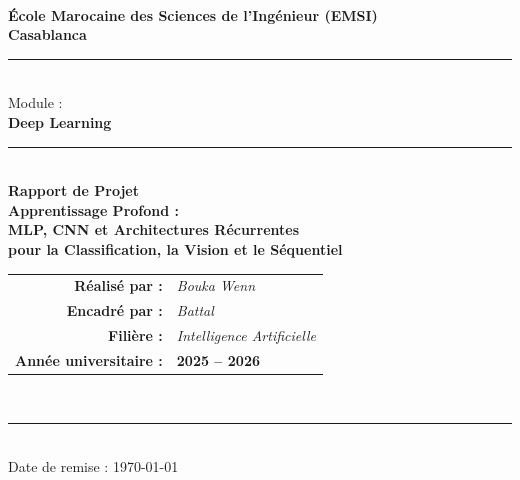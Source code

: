 \documentclass[11pt,a4paper]{article}
\begin{document}
\begin{titlepage}
  \centering


  {\Large\bfseries {}}\\[1.5cm]

  {\Large\bfseries École Marocaine des Sciences de l'Ingénieur (EMSI)\\
  Casablanca}\\[0.3cm]
  \rule{\linewidth}{0.5pt}\\[0.6cm]

  {\large Module :}\\[0.2cm]
  {\LARGE\bfseries Deep Learning}\\[0.8cm]

  \rule{\linewidth}{0.5pt}\\[0.6cm]

  {\huge\bfseries Rapport de Projet\\[0.4cm]
  Apprentissage Profond :}\\[0.4cm]
  {\Large\bfseries MLP, CNN et Architectures Récurrentes\\
  pour la Classification, la Vision et le Séquentiel}\\[1.2cm]

  \begin{tabular}{rl}
    \textbf{Réalisé par :}      & \textit{Bouka Wenn} \\[0.3cm]
    \textbf{Encadré par :}      & \textit{Battal}      \\[0.3cm]
    \textbf{Filière :}          & \textit{Intelligence Artificielle}        \\[0.3cm]
    \textbf{Année universitaire :} & \textbf{2025 -- 2026}
  \end{tabular}\\[2cm]

  \rule{\linewidth}{0.5pt}\\[0.4cm]
  {\large Date de remise : \today}

\end{titlepage}

\newpage
\tableofcontents
\newpage

\listoffigures
{}
\newpage
\end{document}
